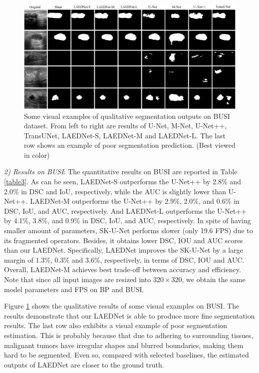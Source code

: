 \documentclass[review]{elsarticle}
\begin{document}
\begin{figure}[!t]
	\includegraphics[width=\textwidth]{results-BUSI3.png}
	\caption{Some visual examples of qualitative segmentation outputs on BUSI \cite{2019Dataset} dataset. From left to right are results of U-Net\cite{2015U}, M-Net\cite{2018Joint}, U-Net++\cite{2020UNet}, TransUNet\cite{chen2021transunet}, LAEDNet-S, LAEDNet-M and LAEDNet-L. The last row shows an example of poor segmentation prediction. (Best viewed in color)}
	\label{fig6}
\end{figure}

\emph{2) Results on BUSI}: The quantitative results on BUSI\cite{2019Dataset} are reported in Table \ref{table3}. As can be seen, LAEDNet-S outperforms the U-Net++\cite{2020UNet} by 2.8\% and 2.0\% in DSC and IoU, respectively, while the AUC is slightly lower than U-Net++\cite{2020UNet}. LAEDNet-M outperforms the U-Net++\cite{2020UNet} by 2.9\%, 2.0\%, and 0.6\% in DSC, IoU, and AUC, respectively. And LAEDNet-L outperforms the U-Net++\cite{2020UNet} by 4.1\%, 3.8\%, and 0.9\% in DSC, IoU, and AUC, respectively. In spite of having smaller amount of parameters, SK-U-Net\cite{2020breastmass} performs slower (only 19.6 FPS) due to its fragmented operators. Besides, it obtains lower DSC, IOU and AUC scores than our LAEDNet. Specifically, LAEDNet improves the SK-U-Net\cite{2020breastmass} by a large margin of 1.3\%, 0.3\% and 3.6\%, respectively, in terms of DSC, IOU and AUC. Overall, LAEDNet-M achieves best trade-off between accuracy and efficiency. Note that since all input images are resized into $320\times320$, we obtain the same model parameters and FPS on BP\cite{Kaggle} and BUSI\cite{2019Dataset}. 

Figure \ref{fig6} shows the qualitative results of some visual examples on BUSI\cite{2019Dataset}. The results demonstrate that our LAEDNet is able to produce more fine segmentation results. The last row also exhibits a visual example of poor segmentation estimation. This is probably because that due to adhering to surrounding tissues, malignant tumors have irregular shapes and blurred boundaries, making them hard to be segmented. Even so, compared with selected baselines, the estimated outputs of LAEDNet are closer to the ground truth.
\end{document}
